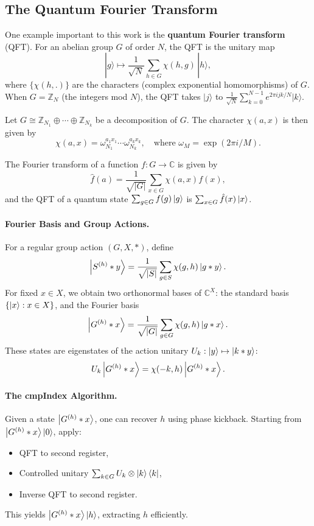 \documentclass[12pt]{report}
\begin{document}
\subsection{The Quantum Fourier Transform}

One example important to this work is the \textbf{quantum Fourier transform} (QFT). For an abelian group $G$ of order $N$, the QFT is the unitary map
\[
|g\rangle \mapsto \frac{1}{\sqrt{N}}\sum_{h \in G} \chi(h,g)\, |h\rangle,
\]
where $\{\chi(h,.)\}$ are the characters (complex exponential homomorphisms) of $G$. When $G = \mathbb{Z}_N$ (the integers mod $N$), the QFT takes $|j\rangle$ to $\frac{1}{\sqrt{N}}\sum_{k=0}^{N-1} e^{2\pi i j k / N} |k\rangle$. 

Let $G \cong \mathbb{Z}_{N_1} \oplus \cdots \oplus \mathbb{Z}_{N_k}$ be a decomposition of $G$. The character $\chi(a, x)$ is then given by
\[
\chi(a, x) = \omega_{N_1}^{a_1x_1} \cdots \omega_{N_k}^{a_kx_k}, \quad \text{where } \omega_M = \exp(2\pi i/ M).
\]

The Fourier transform of a function $f: G \to \mathbb{C}$ is given by
\[
\hat{f}(a) = \frac{1}{\sqrt{|G|}} \sum_{x \in G} \chi(a, x) f(x),
\]
and the QFT of a quantum state $\sum_{g \in G} f(g) \ket{g}$ is $\sum_{x \in G} \hat{f}(x) \ket{x}$.

\paragraph{Fourier Basis and Group Actions.} For a regular group action $(G, X, *)$, define
\[
\ket{S^{(h)} * y} = \frac{1}{\sqrt{|S|}} \sum_{g \in S} \chi(g, h) \ket{g * y}.
\]
For fixed $x \in X$, we obtain two orthonormal bases of $\mathbb{C}^X$: the standard basis $\{ \ket{x} : x \in X \}$, and the Fourier basis
\[
\ket{G^{(h)} * x} = \frac{1}{\sqrt{|G|}} \sum_{g \in G} \chi(g, h) \ket{g * x}.
\]
These states are eigenstates of the action unitary $U_k: \ket{y} \mapsto \ket{k * y}$:
\[
U_k \ket{G^{(h)} * x} = \chi(-k, h) \ket{G^{(h)} * x}.
\]

\paragraph{The cmpIndex Algorithm.}
Given a state $\ket{G^{(h)} * x}$, one can recover $h$ using phase kickback. Starting from $\ket{G^{(h)} * x} \ket{0}$, apply:
\begin{itemize}
    \item QFT to second register,
    \item Controlled unitary $\sum_{k \in G} U_k \otimes \ket{k}\bra{k}$,
    \item Inverse QFT to second register.
\end{itemize}
This yields $\ket{G^{(h)} * x} \ket{h}$, extracting $h$ efficiently.
\end{document}
